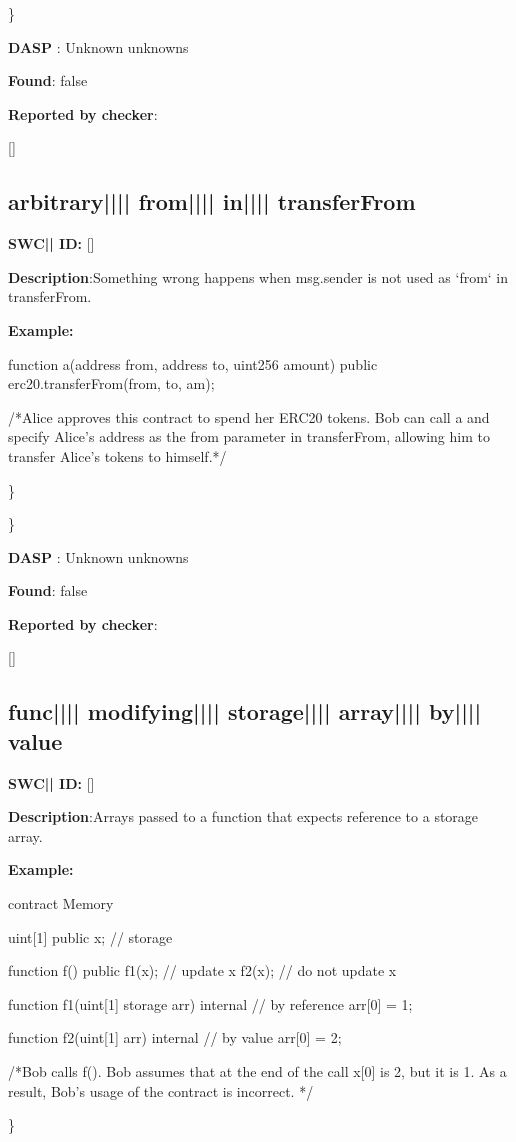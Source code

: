 \documentclass{article}
\begin{document}
\} 

\textbf{DASP} : Unknown unknowns

\textbf{Found}: false

\textbf{Reported by checker}: 
\begin{ffcode} 

[]
\end{ffcode} 
\subsection{arbitrary{||\textunderscore|| }from{||\textunderscore|| }in{||\textunderscore|| }transferFrom} 
\textbf{SWC{|\textunderscore| }ID:} []

\textbf{Description}:Something wrong happens when msg.sender is not used as `from` in transferFrom.


\textbf{Example:} 
\begin{ffcode} 

function a(address from, address to, uint256 amount) public {
  erc20.transferFrom(from, to, am);
}

 /*Alice approves this contract to spend her ERC20 tokens. Bob can call a and specify Alice's address as the from parameter in transferFrom, allowing him to transfer Alice's tokens to himself.*/ 

\end{ffcode} 
\} 

\} 

\textbf{DASP} : Unknown unknowns

\textbf{Found}: false

\textbf{Reported by checker}: 
\begin{ffcode} 

[]
\end{ffcode} 
\subsection{func{||\textunderscore|| }modifying{||\textunderscore|| }storage{||\textunderscore|| }array{||\textunderscore|| }by{||\textunderscore|| }value} 
\textbf{SWC{|\textunderscore| }ID:} []

\textbf{Description}:Arrays passed to a function that expects reference to a storage array.


\textbf{Example:} 
\begin{ffcode} 

contract Memory {
    uint[1] public x; // storage

    function f() public {
        f1(x); // update x
        f2(x); // do not update x
    }

    function f1(uint[1] storage arr) internal { // by reference
        arr[0] = 1;
    }

    function f2(uint[1] arr) internal { // by value
        arr[0] = 2;
    }
}

 /*Bob calls f(). Bob assumes that at the end of the call x[0] is 2, but it is 1. As a result, Bob's usage of the contract is incorrect. */ 

\end{ffcode} 
\} 
\end{document}
